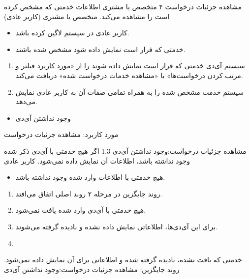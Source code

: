 {
	\usecase
	{مشاهده جزئیات درخواست}
	{۴}
	{متخصص یا مشتری اطلاعات خدمتی که مشخص کرده است را مشاهده می‌کند.}
	{متخصص یا مشتری (کاربر عادی)}
	{}
	{
		\begin{itemize}
			\item
			کاربر عادی در سیستم لاگین کرده باشد.
			
			\item
			‌خدمتی که قرار است نمایش داده شود مشخص شده باشند.
		\end{itemize}
	}
	{
		\begin{enumerate}
			\item 
			سیستم آی‌دی خدمتی که قرار است نمایش داده شوند را از «مورد کاربرد  فیلتر و مرتب کردن درخواست‌ها»  یا «مشاهده خدمات درخواست شده» دریافت می‌کند.
			
			\item
			سیستم خدمت مشخص شده را به همراه تمامی صفات آن به کاربر عادی نمایش می‌دهد.
		\end{enumerate}
	}
	{
	}
	{
		\begin{itemize}
			\item 
			وجود نداشتن آی‌دی‌
		\end{itemize}
	}
	{مورد کاربرد: مشاهده جزئیات درخواست}
	
	\alternativeflow
	{
		مشاهده جزئیات درخواست:وجود‌ نداشتن آی‌دی‌
	}
	{1.3}
	{
		اگر هیچ خدمتی با آی‌دی‌ ذکر شده وجود نداشته باشد، اطلاعات آن نمایش داده نمی‌شود.
	}
	{
		کاربر عادی
	}
	{}
	{
		\begin{itemize}
			
			\item
			هیچ خدمتی با اطلاعات وارد شده وجود نداشته باشد.
		\end{itemize}
	}
	{
		\vspace*{-0.6cm}
		\begin{enumerate}
			\item 
			روند جایگزین در مرحله ۲ روند اصلی اتفاق می‌افتد.
			\item
			هیچ خدمتی با آی‌دی‌ وارد شده یافت نمی‌شود.
			\item 
			برای این آی‌دی‌ها، اطلاعاتی نمایش داده نشده و نادیده گرفته می‌شوند.
			\item
		\end{enumerate}
	}
	{
		خدمتی که یافت نشده‌، نادیده گرفته شده و اطلاعاتی برای آن نمایش داده نمی‌شود.
	}
	{
		روند جایگزین: مشاهده جزئیات درخواست:وجود‌ نداشتن آی‌دی‌
	}
}


